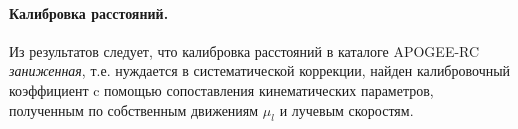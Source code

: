 \documentclass{matmex-diploma-custom}
\begin{document}
\paragraph{Калибровка расстояний.} Из результатов следует, что калибровка расстояний в каталоге APOGEE-RC \textit{заниженная}, т.е. нуждается в систематической коррекции, найден калибровочный коэффициент c помощью сопоставления кинематических параметров, полученным по собственным движениям $\mu_l$ и лучевым скоростям.
\setmonofont[Mapping=tex-text]{CMU Typewriter Text}
\pagebreak




\end{document}
